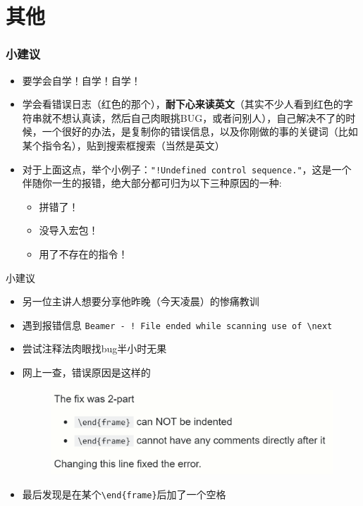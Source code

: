 \section{其他}
    
    \begin{frame}[fragile]
        \frametitle{小建议}
        \begin{itemize}
            \item 要学会自学！自学！自学！
            \item 学会看错误日志（红色的那个），\textbf{耐下心来读英文}（其实不少人看到红色的字符串就不想认真读，然后自己肉眼挑BUG，或者问别人），自己解决不了的时候，一个很好的办法，是复制你的错误信息，以及你刚做的事的关键词（比如某个指令名），贴到搜索框搜索（当然是英文）\pause
             \item 对于上面这点，举个小例子：\verb|"!Undefined control sequence."|，这是一个伴随你一生的报错，绝大部分都可归为以下三种原因的一种:
                 \begin{itemize}
                     \item 拼错了！
                     \item 没导入宏包！
                     \item 用了不存在的指令！
                 \end{itemize}
        \end{itemize}
    \end{frame}
    
    \begin{frame}[fragile]{小建议}
        \begin{itemize}
            \item 另一位主讲人想要分享他昨晚（今天凌晨）的惨痛教训
            \item 遇到报错信息 \verb|Beamer - ! File ended while scanning use of \next|
            \item 尝试注释法肉眼找bug半小时无果
            \item 网上一查，错误原因是这样的
            \begin{figure}
                \centering
                \includegraphics[width=.7\textwidth]{img/bug}
            \end{figure}
            \item 最后发现是在某个\verb|\end{frame}|后加了一个空格
        \end{itemize}
    \end{frame}
    
